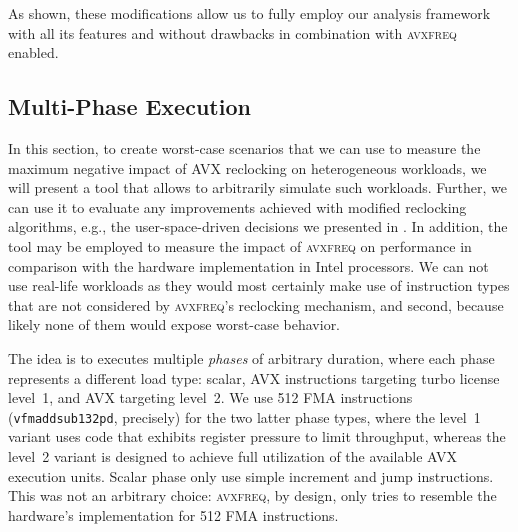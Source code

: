 As shown, these modifications allow us to fully employ our analysis framework with all its features and without drawbacks in combination with \textsc{avxfreq} enabled.

\subsection{Multi-Phase Execution}
\label{sec:evaluation:design:stagedexecution}

In this section, to create worst-case scenarios that we can use to measure the maximum negative impact of \textsc{AVX} reclocking on heterogeneous workloads, we will present a tool that allows to arbitrarily simulate such workloads. Further, we can use it to evaluate any improvements achieved with modified reclocking algorithms, e.g., the user-space-driven decisions we presented in . In addition, the tool may be employed to measure the impact of \textsc{avxfreq} on performance in comparison with the hardware implementation in Intel processors. We can not use real-life workloads as they would most certainly make use of instruction types that are not considered by \textsc{avxfreq}'s reclocking mechanism, and second, because likely none of them would expose worst-case behavior.

The idea is to executes multiple \emph{phases} of arbitrary duration, where each phase represents a different load type: scalar, \gls{AVX} instructions targeting turbo license level~1, and \gls{AVX} targeting level~2. We use \SI[number-unit-product=-]{512}{\bit} \gls{FMA} instructions (\texttt{vfmaddsub132pd}, precisely) for the two latter phase types, where the level~1 variant uses code that exhibits register pressure to limit throughput, whereas the level~2 variant is designed to achieve full utilization of the available \gls{AVX} execution units. Scalar phase only use simple increment and jump instructions. This was not an arbitrary choice: \textsc{avxfreq}, by design, only tries to resemble the hardware's implementation for \SI[number-unit-product=-]{512}{\bit} \gls{FMA} instructions.

